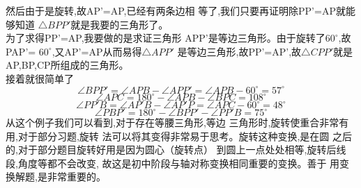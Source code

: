 \documentclass[11pt,twoside,UTF8]{ctexart}
\begin{document}
然后由于是旋转,故AP'=AP,已经有两条边相
等了,我们只要再证明除PP'=AP就能够知道
$\triangle BPP'$就是我要的三角形了。\\
为了求得PP'=AP,我要做的是求证三角形
APP'是等边三角形。由于旋转了$60^\circ$,故PAP'=
$60^\circ$,又AP'=AP从而易得$\triangle APP'$
是等边三角形,故PP'=AP',故$\triangle CPP'$就是
AP,BP,CP所组成的三角形。\\
接着就很简单了
$$\angle BPP'=\angle APB-\angle APP'=\angle APB-60^\circ=57^\circ$$
$$\angle APC=180^\circ -\angle APB-\angle BPC=108^\circ$$
$$\angle PP'B=\angle AP'B-\angle AP'P=\angle APC-60^\circ=48^\circ$$
$$\angle PBP'=180^\circ-\angle BPP'-\angle PP'B=75^\circ$$
从这个例子我们可以看到,对于存在等腰三角形,等边
三角形时,旋转使重合非常有用,对于部分习题,旋转
法可以将其变得非常易于思考。旋转这种变换,是在圆
之后的,对于部分题目旋转好用是因为圆心（旋转点）
到圆上一点处处相等,旋转后线段,角度等都不会改变,
故这是初中阶段与轴对称变换相同重要的变换。善于
用变换解题,是非常重要的。
\end{document}
